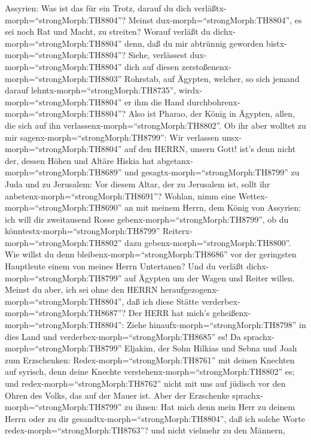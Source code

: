 Assyrien: Was ist das für ein Trotz, darauf du dich
verläßtx-morph=``strongMorph:TH8804''?  Meinst
dux-morph=``strongMorph:TH8804'', es sei noch Rat und Macht, zu
streiten? Worauf verläßt du dichx-morph=``strongMorph:TH8804'' denn, daß
du mir abtrünnig geworden bistx-morph=``strongMorph:TH8804''?
 Siehe, verlässest dux-morph=``strongMorph:TH8804'' dich
auf diesen zerstoßenenx-morph=``strongMorph:TH8803'' Rohrstab, auf
Ägypten, welcher, so sich jemand darauf
lehntx-morph=``strongMorph:TH8735'', wirdx-morph=``strongMorph:TH8804''
er ihm die Hand durchbohrenx-morph=``strongMorph:TH8804''? Also ist
Pharao, der König in Ägypten, allen, die sich auf ihn
verlassenx-morph=``strongMorph:TH8802''.  Ob ihr aber
wolltet zu mir sagenx-morph=``strongMorph:TH8799'': Wir verlassen
unsx-morph=``strongMorph:TH8804'' auf den HERRN, unsern Gott! ist's denn
nicht der, dessen Höhen und Altäre Hiskia hat
abgetanx-morph=``strongMorph:TH8689'' und
gesagtx-morph=``strongMorph:TH8799'' zu Juda und zu Jerusalem: Vor
diesem Altar, der zu Jerusalem ist, sollt ihr
anbetenx-morph=``strongMorph:TH8691''?  Wohlan, nimm eine
Wettex-morph=``strongMorph:TH8690'' an mit meinem Herrn, dem König von
Assyrien: ich will dir zweitausend Rosse
gebenx-morph=``strongMorph:TH8799'', ob du
könntestx-morph=``strongMorph:TH8799''
Reiterx-morph=``strongMorph:TH8802'' dazu
gebenx-morph=``strongMorph:TH8800''.  Wie willst du denn
bleibenx-morph=``strongMorph:TH8686'' vor der geringsten Hauptleute
einem von meines Herrn Untertanen? Und du verläßt
dichx-morph=``strongMorph:TH8799'' auf Ägypten um der Wagen und Reiter
willen.  Meinst du aber, ich sei ohne den HERRN
heraufgezogenx-morph=``strongMorph:TH8804'', daß ich diese Stätte
verderbex-morph=``strongMorph:TH8687''? Der HERR hat mich's
geheißenx-morph=``strongMorph:TH8804'': Ziehe
hinaufx-morph=``strongMorph:TH8798'' in dies Land und
verderbex-morph=``strongMorph:TH8685'' es!  Da
sprachx-morph=``strongMorph:TH8799'' Eljakim, der Sohn Hilkias und Sebna
und Joah zum Erzschenken: Redex-morph=``strongMorph:TH8761'' mit deinen
Knechten auf syrisch, denn deine Knechte
verstehenx-morph=``strongMorph:TH8802'' es; und
redex-morph=``strongMorph:TH8762'' nicht mit uns auf jüdisch vor den
Ohren des Volks, das auf der Mauer ist.  Aber der
Erzschenke sprachx-morph=``strongMorph:TH8799'' zu ihnen: Hat mich denn
mein Herr zu deinem Herrn oder zu dir
gesandtx-morph=``strongMorph:TH8804'', daß ich solche Worte
redex-morph=``strongMorph:TH8763''? und nicht vielmehr zu den Männern,
